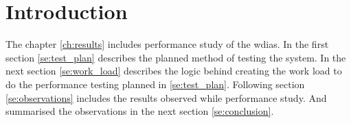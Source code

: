 \section{Introduction}
The chapter \ref{ch:results} includes performance study of the \acrshort{wdias}. In the first section \ref{se:test_plan} describes the planned method of testing the system.
In the next section \ref{se:work_load} describes the logic behind creating the work load to do the performance testing planned in \ref{se:test_plan}.
Following section \ref{se:observations} includes the results observed while performance study. And summarised the observations in the next section \ref{se:conclusion}.
